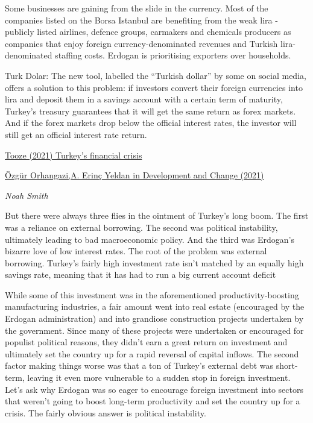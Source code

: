 \documentclass[
]{book}
\begin{document}
Some businesses are gaining from the slide in the currency. Most of the companies listed on the Borsa Istanbul are benefiting from the weak lira - publicly listed airlines, defence groups, carmakers and chemicals producers as companies that enjoy foreign currency-denominated revenues and Turkish lira-denominated staffing costs. Erdogan is prioritising exporters over households.

Turk Dolar: The new tool, labelled the ``Turkish dollar'' by some on social media, offers a solution to this problem: if investors convert their foreign currencies into lira and deposit them in a savings account with a certain term of maturity, Turkey's treasury guarantees that it will get the same return as forex markets. And if the forex markets drop below the official interest rates, the investor will still get an official interest rate return.

\href{https://adamtooze.substack.com/p/chartbook-63-turkeys-financial-crisis}{Tooze (2021) Turkey's financial crisis}

\href{https://onlinelibrary.wiley.com/doi/full/10.1111/dech.12644}{Özgür Orhangazi,A. Erinç Yeldan in Development and Change (2021)}

\emph{Noah Smith}

But there were always three flies in the ointment of Turkey's long boom. The first was a reliance on external borrowing. The second was political instability, ultimately leading to bad macroeconomic policy. And the third was Erdogan's bizarre love of low interest rates.
The root of the problem was external borrowing. Turkey's fairly high investment rate isn't matched by an equally high savings rate, meaning that it has had to run a big current account deficit

While some of this investment was in the aforementioned productivity-boosting manufacturing industries, a fair amount went into real estate (encouraged by the Erdogan administration) and into grandiose construction projects undertaken by the government. Since many of these projects were undertaken or encouraged for populist political reasons, they didn't earn a great return on investment and ultimately set the country up for a rapid reversal of capital inflows. The second factor making things worse was that a ton of Turkey's external debt was short-term, leaving it even more vulnerable to a sudden stop in foreign investment.
Let's ask why Erdogan was so eager to encourage foreign investment into sectors that weren't going to boost long-term productivity and set the country up for a crisis. The fairly obvious answer is political instability.
\end{document}
